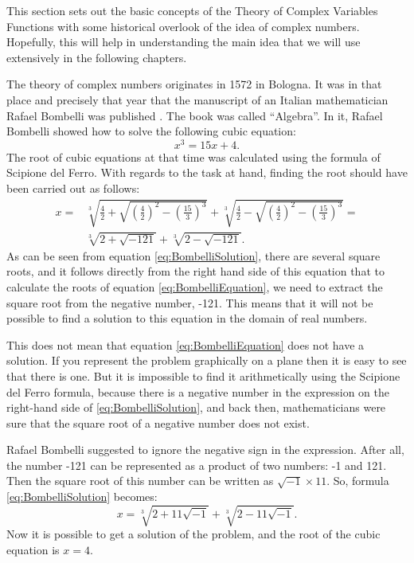 \documentclass[
]{book}
\begin{document}
This section sets out the basic concepts of the Theory of Complex Variables Functions with some historical overlook of the idea of complex numbers. Hopefully, this will help in understanding the main idea that we will use extensively in the following chapters.

The theory of complex numbers originates in 1572 in Bologna. It was in that place and precisely that year that the manuscript of an Italian mathematician Rafael Bombelli was published \citep{Bombelli1572}. The book was called ``Algebra''. In it, Rafael Bombelli showed how to solve the following cubic equation:
\begin{equation}
    x^3 = 15x + 4 .
    \label{eq:BombelliEquation}
\end{equation}
The root of cubic equations at that time was calculated using the formula of Scipione del Ferro. With regards to the task at hand, finding the root should have been carried out as follows:
\begin{equation}
    \begin{aligned}
    x = & \sqrt[3]{\frac{4}{2}+\sqrt{\left(\frac{4}{2}\right)^2 - \left(\frac{15}{3}\right)^3}} + \sqrt[3]{\frac{4}{2}-\sqrt{\left(\frac{4}{2}\right)^2 - \left(\frac{15}{3}\right)^3}} = \\
        & \sqrt[3]{2+\sqrt{-121}} + \sqrt[3]{2-\sqrt{-121}} .
    \end{aligned}
    \label{eq:BombelliSolution}
\end{equation}
As can be seen from equation \eqref{eq:BombelliSolution}, there are several square roots, and it follows directly from the right hand side of this equation that to calculate the roots of equation \eqref{eq:BombelliEquation}, we need to extract the square root from the negative number, -121. This means that it will not be possible to find a solution to this equation in the domain of real numbers.

This does not mean that equation \eqref{eq:BombelliEquation} does not have a solution. If you represent the problem graphically on a plane then it is easy to see that there is one. But it is impossible to find it arithmetically using the Scipione del Ferro formula, because there is a negative number in the expression on the right-hand side of \eqref{eq:BombelliSolution}, and back then, mathematicians were sure that the square root of a negative number does not exist.

Rafael Bombelli suggested to ignore the negative sign in the expression. After all, the number -121 can be represented as a product of two numbers: -1 and 121. Then the square root of this number can be written as \(\sqrt{-1} \times 11\). So, formula \eqref{eq:BombelliSolution} becomes:
\begin{equation}
    x = \sqrt[3]{2+11\sqrt{-1}} + \sqrt[3]{2-11\sqrt{-1}} .
    \label{eq:BombelliSolutionSqrt}
\end{equation}
Now it is possible to get a solution of the problem, and the root of the cubic equation is \(x = 4\).
\end{document}
